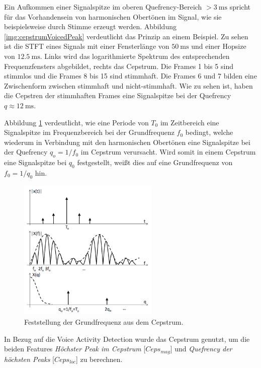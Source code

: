 Ein Aufkommen einer Signalspitze im oberen Quefrency-Bereich $> \SI{3}{\milli\second}$ spricht für das Vorhandensein von harmonischen Obertönen im Signal, wie sie beispielsweise durch Stimme erzeugt werden. Abbildung \ref{img:cepstrumVoicedPeak} verdeutlicht das Prinzip an einem Beispiel. Zu sehen ist die STFT eines Signals mit einer Fensterlänge von $\SI{50}{\milli\second}$ und einer Hopsize von $\SI{12.5}{\milli\second}$. Links wird das logarithmierte Spektrum des entsprechenden Frequenzfensters abgebildet, rechts das Cepstrum. Die Frames 1 bis 5 sind stimmlos und die Frames 8 bis 15 sind stimmhaft. Die Frames 6 und 7 bilden eine Zwischenform zwischen stimmhaft und nicht-stimmhaft. Wie zu sehen ist, haben die Cepstren der stimmhaften Frames eine Signalspitze bei der Quefrency $q \approx \SI{12}{\milli\second}$.\cite[S. 16]{ricardo_ceps}

Abbildung \ref{img:cepstrumPitch} verdeutlicht, wie eine Periode von $T_0$ im Zeitbereich eine Signalspitze im Frequenzbereich bei der Grundfrequenz $f_0$ bedingt, welche wiederum in Verbindung mit den harmonischen Obertönen eine Signalspitze bei der Quefrency $q_o = 1 / f_0$ im Cepstrum verursacht. Wird somit in einem Cepstrum eine Signalspitze bei $q_0$ festgestellt, weißt dies auf eine Grundfrequenz von $f_0 = 1/q_0$ hin. \cite[S. 5]{cepstrumPitchTranslation}

\begin{figure}[h]
	\centering
	\includegraphics[width=0.6\textwidth]{bilder/cepstrumPitch.png}
	\caption{Feststellung der Grundfrequenz aus dem Cepstrum. \cite[S. 5]{cepstrumPitchTranslation}}
	\label{img:cepstrumPitch}
\end{figure}

In Bezug auf die Voice Activity Detection wurde das Cepstrum genutzt, um die beiden Features \emph{Höchster Peak im Cepstrum} [$Ceps_{mag}$] und \emph{Quefrency der höchsten Peaks} [$Ceps_{loc}$] zu berechnen.

